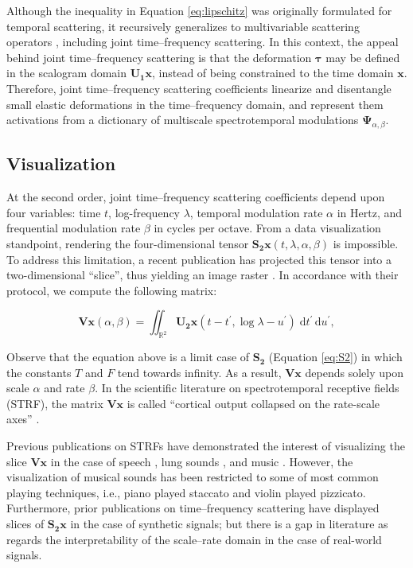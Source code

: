 \documentclass{bmcart}
\begin{document}
Although the inequality in Equation \ref{eq:lipschitz} was originally formulated for temporal scattering, it recursively generalizes to multivariable scattering operators \cite{oyallon2014iclr}, including joint time--frequency scattering.
In this context, the appeal behind joint time--frequency scattering is that the deformation $\boldsymbol{\tau}$ may be defined in the scalogram domain $\mathbf{U_1}\boldsymbol{x}$, instead of being constrained to the time domain $\boldsymbol{x}$.
Therefore, joint time--frequency scattering coefficients linearize and disentangle small elastic deformations in the time--frequency domain, and represent them activations from a dictionary of multiscale spectrotemporal modulations $\boldsymbol{\Psi}_{\alpha, \beta}$.



\subsection*{Visualization}
\label{sec:visualization}

At the second order, joint time--frequency scattering coefficients depend upon four variables: time $t$, log-frequency $\lambda$, temporal modulation rate $\alpha$ in Hertz, and frequential modulation rate $\beta$ in cycles per octave.
From a data visualization standpoint, rendering the four-dimensional tensor $\mathbf{S_2}\boldsymbol{x}(t, \lambda, \alpha, \beta)$ is impossible.
To address this limitation, a recent publication has projected this tensor into a two-dimensional ``slice'', thus yielding an image raster \cite{anden2019tsp}.
In accordance with their protocol, we compute the following matrix:

\begin{equation}
\mathbf{V}\boldsymbol{x}(\alpha, \beta) =
\iint_{\mathbb{R}^2}
\mathbf{U_2}\boldsymbol{x}(t - t^\prime, \log \lambda - u^\prime)
\;\mathrm{d}t^\prime \, \mathrm{d}u^\prime,
\end{equation}

Observe that the equation above is a limit case of $\mathbf{S_2}$ (Equation \ref{eq:S2}) in which the constants $T$ and $F$ tend towards infinity.
As a result, $\mathbf{V}\boldsymbol{x}$ depends solely upon scale $\alpha$ and rate $\beta$.
In the scientific literature on spectrotemporal receptive fields (STRF), the matrix $\mathbf{V}\boldsymbol{x}$ is called ``cortical output collapsed on the rate-scale axes'' \cite{elhilali2003speechcomm}.

Previous publications on STRFs have demonstrated the interest of visualizing the slice $\mathbf{V}\boldsymbol{x}$ in the case of speech \cite{bellur2015ciss}, lung sounds \cite{emmanouilidou2012embs}, and music \cite{patil2012ploscompbiol}.
However, the visualization of musical sounds has been restricted to some of most common playing techniques, i.e., piano played staccato and violin played pizzicato.
Furthermore, prior publications on time--frequency scattering have displayed slices of $\mathbf{S_2}\boldsymbol{x}$ in the case of synthetic signals; but there is a gap in literature as regards the interpretability of the scale--rate domain in the case of real-world signals.
\end{document}
